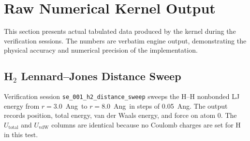 \documentclass[11pt,twoside]{article}
\def\AA{Ang}%
\begin{document}
\section{Raw Numerical Kernel Output}
\label{sec:rawoutput}

This section presents actual tabulated data produced by the kernel during the verification sessions. The numbers are verbatim engine output, demonstrating the physical accuracy and numerical precision of the implementation.

\subsection{H$_2$ Lennard--Jones Distance Sweep}

Verification session \texttt{se\_001\_h2\_distance\_sweep} sweeps the H--H nonbonded LJ energy from $r = 3.0$~\AA\ to $r = 8.0$~\AA\ in steps of 0.05~\AA. The output records position, total energy, van der Waals energy, and force on atom 0. The $U_{\mathrm{total}}$ and $U_{\mathrm{vdW}}$ columns are identical because no Coulomb charges are set for H in this test.
\end{document}
